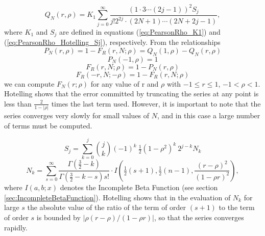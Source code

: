 \begin{equation}
	Q_N(r,\rho) = K_1 \sum_{j=0}^{\infty}{\frac{(1 \cdot 3 \cdots (2j-1))^2 S_j}{j! 2^{2j} \cdot (2N+1) \cdots (2N+2j-1)}},
\end{equation}
where $K_1$ and $S_j$ are defined in equations (\ref{eq:PearsonRho_K1}) and (\ref{eq:PearsonRho_Hotelling_Sj}), respectively. From the relationships
\begin{equation}
	P_N(r, \rho) = 1-F_R(r, N; \rho) = Q_N(1,\rho)-Q_N(r,\rho)
\end{equation}
\begin{equation}
	P_N(-1, \rho) = 1
\end{equation}
\begin{equation}
	F_R(r, N; \rho) = 1 -P_N(r, \rho)
\end{equation}
\begin{equation}
	F_R(-r, N; -\rho) = 1 -F_R(r, N; \rho)
\end{equation}
we can compute $F_N(r;\rho)$ for any value of r and $\rho$ with $-1 \leq r \leq 1$, $-1<\rho<1$.
Hotelling shows that the error committed by truncating the series at any point is less than $\frac{2}{1-|\rho|}$ times the last term used. However, it is important to note that the series converges very slowly for small values of $N$, and in this case a large number of terms must be computed.

\begin{equation}  \label{eq:PearsonRho_Hotelling_Sj}
	S_j = \sum_{k=0}^{j} \binom{j}{k}(-1)^k \: \tfrac{1}{2} (1-\rho^2)^k \: 2^{j-k}  N_k
\end{equation}
\begin{equation}
	N_k = \sum_{s=0}^{\infty} \frac{\Gamma\left(\tfrac{3}{2}-k\right)}{\Gamma\left(\tfrac{3}{2}-k-s\right) s!} \cdot I \left(\tfrac{1}{2}(s+1), \tfrac{1}{2}(n-1),\frac{(r-\rho)^2}{(1-\rho r)^2}\right),
\end{equation} 
where $I(a,b;x)$ denotes the Incomplete Beta Function (see section \ref{sec:IncompleteBetaFunction}). Hotelling shows that in the evaluation of $N_k$ for large $s$ the absolute value of the ratio of the term of order $(s+1)$ to the term of order $s$ is bounded by $|\rho (r-\rho)/(1-\rho r)|$, so that the series converges rapidly.


